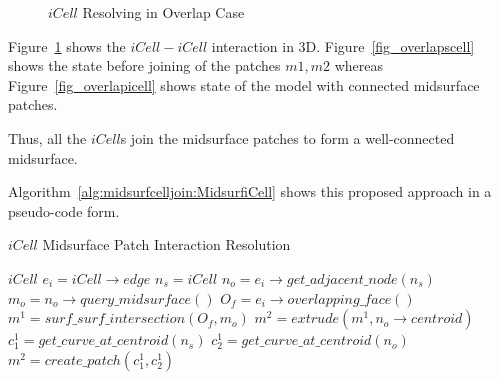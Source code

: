 	\begin{figure}[!h]
	\centering     %
	\quad
	\caption{$iCell$ Resolving in Overlap Case} %
	\label{fig_icellsovrelap}
	\end{figure}
	


Figure~\ref{fig_icellsovrelap} shows the $iCell-iCell$ interaction in 3D. Figure~\ref{fig_overlapscell} shows the state before joining of the patches $m1,m2$ whereas  Figure~\ref{fig_overlapicell} shows state of the model with connected midsurface patches.


Thus, all the $iCell$s join the midsurface patches to form a well-connected midsurface.


Algorithm~\ref{alg:midsurfcelljoin:MidsurfiCell} shows this proposed approach in a pseudo-code form.

	
	\begin{algorithm}[H]
		\caption{$iCell$ Midsurface Patch Interaction Resolution}
		\label{alg:midsurfcelljoin:MidsurfiCell}
		\begin{algorithmic}[1]
			\REQUIRE $iCell$
				\STATE $e_i = iCell \rightarrow edge$
				\STATE $n_s = iCell $	
				\STATE $n_o = e_i \rightarrow get\_adjacent\_node(n_s) $			
					\STATE $m_o = n_o \rightarrow query\_midsurface()$
					\STATE $O_f = e_i \rightarrow overlapping\_face()$
					\STATE $m^1 = surf\_surf\_intersection(O_f, m_o)$
					\STATE $m^2 = extrude(m^1, n_o \rightarrow centroid)$
					\STATE $c^1_1= get\_curve\_at\_centroid(n_s)$
					\STATE $c^1_2 = get\_curve\_at\_centroid(n_o)$
					\STATE $m^2 = create\_patch(c^1_1, c^1_2)$
					\ENDIF
			\ENDWHILE
		\end{algorithmic}
	\end{algorithm}

